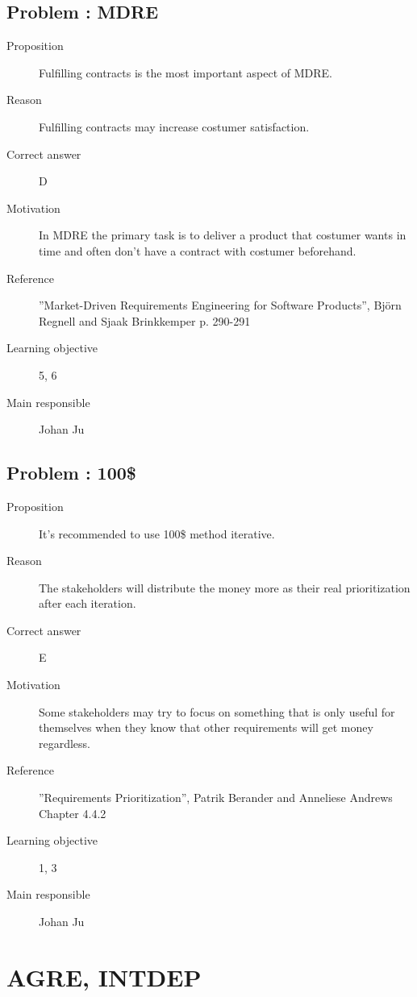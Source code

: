 \documentclass[10pt,a4paper]{article}
\begin{document}
\subsection*{Problem : MDRE}
\begin{description}
\item[Proposition] Fulfilling contracts is the most important aspect of MDRE.
\item[Reason] Fulfilling contracts may increase costumer satisfaction. 
\item[Correct answer] D
\item[Motivation] In MDRE the primary task is to deliver a product that costumer wants in time and often don't have a contract with costumer beforehand.
\item[Reference] ”Market-Driven Requirements Engineering for Software Products”, Björn
Regnell and Sjaak Brinkkemper p. 290-291
\item[Learning objective] 5, 6
\item[Main responsible] Johan Ju
\end{description}

\subsection*{Problem : 100\$}
\begin{description} 
\item[Proposition] It's recommended to use 100\$ method iterative.
\item[Reason] The stakeholders will distribute the money more as their real prioritization after each iteration.  
\item[Correct answer] E
\item[Motivation] Some stakeholders may try to focus on something that is only useful for themselves when they know that other requirements will get money regardless. 
\item[Reference] ”Requirements Prioritization”, Patrik Berander and Anneliese Andrews Chapter 4.4.2  
\item[Learning objective] 1, 3
\item[Main responsible] Johan Ju
\end{description}


\section*{AGRE, INTDEP}
\end{document}
